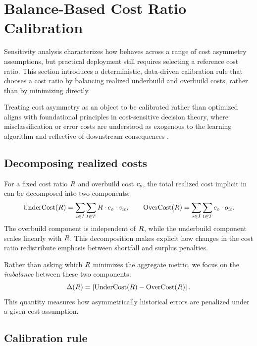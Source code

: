 \section{Balance-Based Cost Ratio Calibration}
\label{sec:calibration}

Sensitivity analysis characterizes how \CWSL{} behaves across a range of cost
asymmetry assumptions, but practical deployment still requires selecting a
reference cost ratio.
This section introduces a deterministic, data-driven calibration rule that
chooses a cost ratio by balancing realized underbuild and overbuild costs,
rather than by minimizing \CWSL{} directly.

Treating cost asymmetry as an object to be calibrated rather than optimized
aligns with foundational principles in cost-sensitive decision theory, where
misclassification or error costs are understood as exogenous to the learning
algorithm and reflective of downstream consequences \citep{elkan2001}.

\subsection{Decomposing realized costs}
\label{subsec:cost_decomposition}

For a fixed cost ratio $R{}$ and overbuild cost $c_o{}$, the total realized cost
implicit in \CWSL{} can be decomposed into two components:
\[
    \mathrm{UnderCost}(R{})
    =
    \sum_{i \in I} \sum_{t \in T} R{} \cdot c_o{} \cdot s_{it},
    \qquad
    \mathrm{OverCost}(R{})
    =
    \sum_{i \in I} \sum_{t \in T} c_o{} \cdot o_{it}.
\]
The overbuild component is independent of $R{}$, while the underbuild component
scales linearly with $R{}$.
This decomposition makes explicit how changes in the cost ratio redistribute
emphasis between shortfall and surplus penalties.

Rather than asking which $R{}$ minimizes the aggregate metric, we focus on the
\emph{imbalance} between these two components:
\[
    \Delta(R{}) = \left| \mathrm{UnderCost}(R{}) - \mathrm{OverCost}(R{}) \right|.
\]
This quantity measures how asymmetrically historical errors are penalized under
a given cost assumption.

\subsection{Calibration rule}
\label{subsec:calibration_rule}


